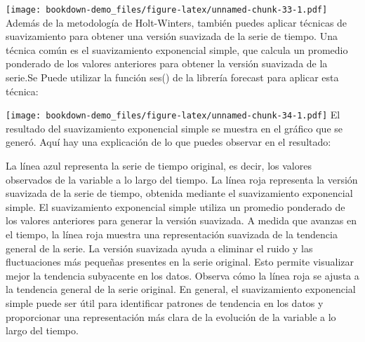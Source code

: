 \documentclass[
]{book}
\newenvironment{Shaded}{\begin{snugshade}}{\end{snugshade}}
\newcommand{\AttributeTok}[1]{\textcolor[rgb]{0.77,0.63,0.00}{#1}}
\newcommand{\CommentTok}[1]{\textcolor[rgb]{0.56,0.35,0.01}{\textit{#1}}}
\newcommand{\DecValTok}[1]{\textcolor[rgb]{0.00,0.00,0.81}{#1}}
\newcommand{\FunctionTok}[1]{\textcolor[rgb]{0.00,0.00,0.00}{#1}}
\newcommand{\NormalTok}[1]{#1}
\newcommand{\OtherTok}[1]{\textcolor[rgb]{0.56,0.35,0.01}{#1}}
\newcommand{\SpecialCharTok}[1]{\textcolor[rgb]{0.00,0.00,0.00}{#1}}
\newcommand{\StringTok}[1]{\textcolor[rgb]{0.31,0.60,0.02}{#1}}
\begin{document}
\texttt{[image: bookdown-demo\_files/figure-latex/unnamed-chunk-33-1.pdf]}
Además de la metodología de Holt-Winters, también puedes aplicar técnicas de suavizamiento para obtener una versión suavizada de la serie de tiempo. Una técnica común es el suavizamiento exponencial simple, que calcula un promedio ponderado de los valores anteriores para obtener la versión suavizada de la serie.Se Puede utilizar la función ses() de la librería forecast para aplicar esta técnica:

\begin{Shaded}
\end{Shaded}

\texttt{[image: bookdown-demo\_files/figure-latex/unnamed-chunk-34-1.pdf]}
El resultado del suavizamiento exponencial simple se muestra en el gráfico que se generó. Aquí hay una explicación de lo que puedes observar en el resultado:

La línea azul representa la serie de tiempo original, es decir, los valores observados de la variable a lo largo del tiempo.
La línea roja representa la versión suavizada de la serie de tiempo, obtenida mediante el suavizamiento exponencial simple.
El suavizamiento exponencial simple utiliza un promedio ponderado de los valores anteriores para generar la versión suavizada. A medida que avanzas en el tiempo, la línea roja muestra una representación suavizada de la tendencia general de la serie.
La versión suavizada ayuda a eliminar el ruido y las fluctuaciones más pequeñas presentes en la serie original. Esto permite visualizar mejor la tendencia subyacente en los datos.
Observa cómo la línea roja se ajusta a la tendencia general de la serie original. En general, el suavizamiento exponencial simple puede ser útil para identificar patrones de tendencia en los datos y proporcionar una representación más clara de la evolución de la variable a lo largo del tiempo.
\end{document}
